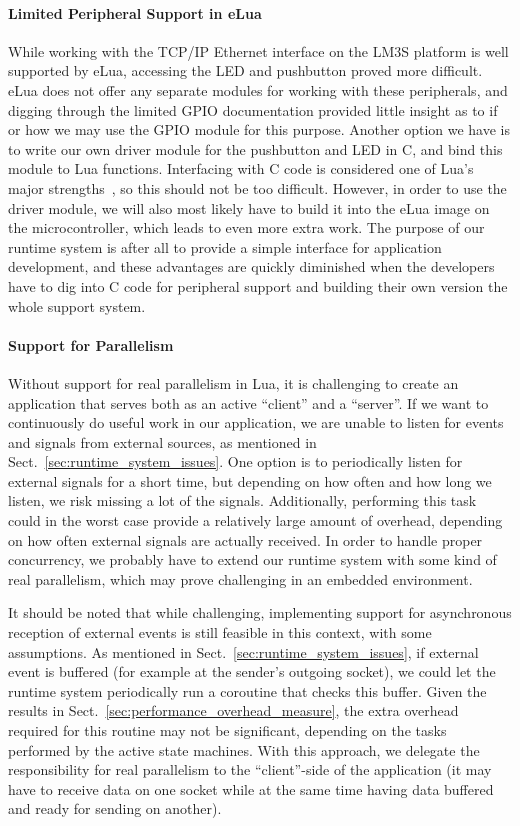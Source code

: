 \paragraph{Limited Peripheral Support in eLua} While working with the TCP/IP Ethernet interface on the LM3S platform is well supported by eLua, accessing the LED and pushbutton proved more difficult. eLua does not offer any separate modules for working with these peripherals, and digging through the limited GPIO documentation provided little insight as to if or how we may use the GPIO module for this purpose. Another option we have is to write our own driver module for the pushbutton and LED in C, and bind this module to Lua functions. Interfacing with C code is considered one of Lua's major strengths~\cite{inproceedings:the_evolution_of_lua}, so this should not be too difficult. However, in order to use the driver module, we will also most likely have to build it into the eLua image on the microcontroller, which leads to even more extra work. The purpose of our runtime system is after all to provide a simple interface for application development, and these advantages are quickly diminished when the developers have to dig into C code for peripheral support and building their own version the whole support system.

\paragraph{Support for Parallelism} Without support for real parallelism in Lua, it is challenging to create an application that serves both as an active ``client'' and a ``server''. If we want to continuously do useful work in our application, we are unable to listen for events and signals from external sources, as mentioned in Sect.~\ref{sec:runtime_system_issues}. One option is to periodically listen for external signals for a short time, but depending on how often and how long we listen, we risk missing a lot of the signals. Additionally, performing this task could in the worst case provide a relatively large amount of overhead, depending on how often external signals are actually received. In order to handle proper concurrency, we probably have to extend our runtime system with some kind of real parallelism, which may prove challenging in an embedded environment.

\noindent
It should be noted that while challenging, implementing support for asynchronous reception of external events is still feasible in this context, with some assumptions. As mentioned in Sect.~\ref{sec:runtime_system_issues}, if external event is buffered (for example at the sender's outgoing socket), we could let the runtime system periodically run a coroutine that checks this buffer. Given the results in Sect.~\ref{sec:performance_overhead_measure}, the extra overhead required for this routine may not be significant, depending on the tasks performed by the active state machines. With this approach, we delegate the responsibility for real parallelism to the ``client''-side of the application (it may have to receive data on one socket while at the same time having data buffered and ready for sending on another).

